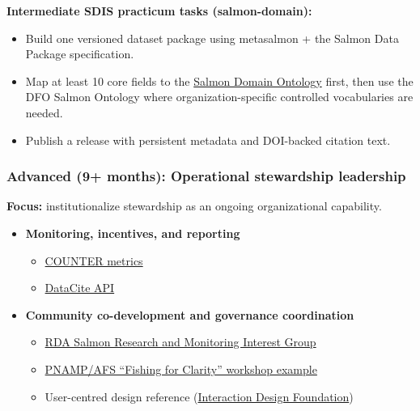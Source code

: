 \documentclass[
  letterpaper,
  DIV=11,
  numbers=noendperiod]{scrartcl}
\providecommand{\tightlist}{%
  \setlength{\itemsep}{0pt}\setlength{\parskip}{0pt}}
\begin{document}
\textbf{Intermediate SDIS practicum tasks (salmon-domain):}

\begin{itemize}
\tightlist
\item
  Build one versioned dataset package using metasalmon + the Salmon Data
  Package specification.
\item
  Map at least 10 core fields to the
  \href{https://github.com/salmon-data-mobilization/salmon-domain-ontology/}{Salmon
  Domain Ontology} first, then use the DFO Salmon Ontology where
  organization-specific controlled vocabularies are needed.
\item
  Publish a release with persistent metadata and DOI-backed citation
  text.
\end{itemize}

\subsubsection{Advanced (9+ months): Operational stewardship
leadership}\label{advanced-9-months-operational-stewardship-leadership}

\textbf{Focus:} institutionalize stewardship as an ongoing
organizational capability.

\begin{itemize}
\tightlist
\item
  \textbf{Monitoring, incentives, and reporting}

  \begin{itemize}
  \tightlist
  \item
    \href{https://www.countermetrics.org/}{COUNTER metrics}
  \item
    \href{https://support.datacite.org/docs/api}{DataCite API}
  \end{itemize}
\item
  \textbf{Community co-development and governance coordination}

  \begin{itemize}
  \tightlist
  \item
    \href{https://www.rd-alliance.org/groups/salmon-research-and-monitoring-ig/}{RDA
    Salmon Research and Monitoring Interest Group}
  \item
    \href{https://pnamp.org/event/workshop-fishing-for-clarity-knowledge-modeling-to-support-cross-organizational-collaboration-and-data-sharing-about-salmon-escapement/}{PNAMP/AFS
    ``Fishing for Clarity'' workshop example}
  \item
    User-centred design reference
    (\href{https://www.interaction-design.org/literature/topics/user-centered-design}{Interaction
    Design Foundation})
  \end{itemize}
\end{itemize}
\end{document}
